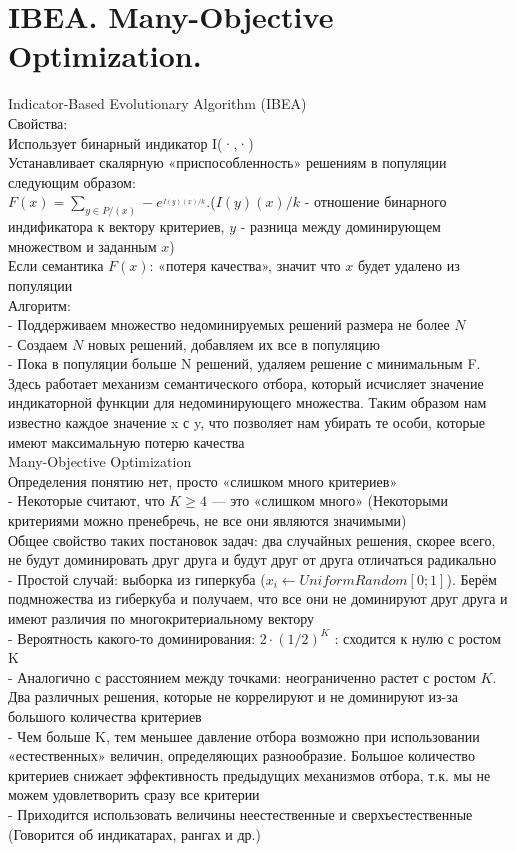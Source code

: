 \section{IBEA. Many-Objective Optimization.}
Indicator-Based Evolutionary Algorithm (IBEA)\\

Свойства:\\
Использует бинарный индикатор I(·,·)\\
Устанавливает скалярную «приспособленность» решениям в популяции следующим образом: \\
$F(x) = \sum_{y∈P/(x)} −e^_{I(y)(x)/k}$.($I(y)(x)/k$ - отношение бинарного индификатора к вектору критериев, $y$ - разница между доминирующем множеством и заданным $x$)\\
Если семантика $F(x)$: «потеря качества», значит что $x$ будет удалено из популяции\\

Алгоритм:\\
- Поддерживаем множество недоминируемых решений размера не более $N$\\
- Создаем $N$ новых решений, добавляем их все в популяцию\\
- Пока в популяции больше N решений, удаляем решение с минимальным F. Здесь работает механизм семантического отбора, который исчисляет значение индикаторной функции для недоминирующего множества. Таким образом нам известно каждое значение x с y, что позволяет нам убирать те особи, которые имеют максимальную потерю качества\\

Many-Objective Optimization\\
Определения понятию нет, просто «слишком много критериев»\\
- Некоторые считают, что $K ≥ 4$ — это «слишком много» (Некоторыми критериями можно пренебречь, не все они являются значимыми)\\
Общее свойство таких постановок задач: два случайных решения, скорее
всего, не будут доминировать друг друга и будут друг от друга отличаться радикально\\
- Простой случай: выборка из гиперкуба ($x_{i} ← UniformRandom[0; 1]$). Берём подмножества из гиберкуба и получаем, что все они не доминируют друг друга и имеют различия по многокритериальному вектору\\
- Вероятность какого-то доминирования: $2 · (1/2)^K$ : сходится к нулю с ростом K\\
- Аналогично с расстоянием между точками: неограниченно растет с ростом $K$. Два различных решения, которые не коррелируют и не доминируют из-за большого количества критериев\\
- Чем больше K, тем меньшее давление отбора возможно при использовании «естественных» величин, определяющих разнообразие. Большое количество критериев снижает эффективность предыдущих механизмов отбора, т.к. мы не можем удовлетворить сразу все критерии  \\
- Приходится использовать величины неестественные и сверхъестественные (Говорится об индикатарах, рангах и др.) 
